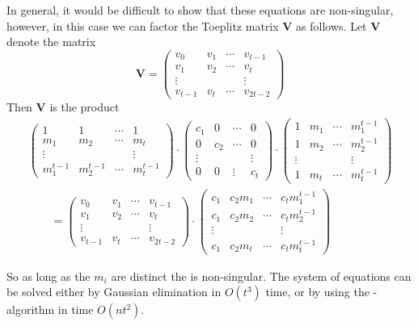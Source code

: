In general, it would be difficult to show that these equations are
non-singular, however, in this case we can factor the Toeplitz matrix
$\mathbf{V}$ as follows.  Let $\mathbf{V}$ denote the matrix
\[
\mathbf{V} = \begin{pmatrix}v_0 & v_1 & \cdots & v_{t-1} \\
v_1 & v_2 & \cdots & v_t \\
\vdots & & & \vdots\\
v_{t-1} & v_t & \cdots & v_{2t-2}\end{pmatrix}
\]
Then $\mathbf{V}$ is the product
\small
\[
\begin{aligned}
\begin{pmatrix}1 & 1 & \cdots & 1 \\
m_1 & m_2 & \cdots & m_t \\
\vdots & & & \vdots\\
m_1^{t-1} & m_2^{t-1} & \cdots & m_t^{t-1} \end{pmatrix}
\cdot
\begin{pmatrix}c_1 & 0 & \cdots & 0\\
0 & c_2 & \cdots & 0 \\
\vdots & & & \vdots \\
0 & 0 & \vdots & c_t\end{pmatrix}
\cdot
\begin{pmatrix}
1& m_1 & \cdots & m_1^{t-1}\\
1& m_2 & \cdots & m_2^{t-1}\\
\vdots& & & \vdots\\
1& m_t  & \cdots & m_t^{t-1}\end{pmatrix} \\
\qquad = \begin{pmatrix}v_0 & v_1 & \cdots & v_{t-1} \\
v_1 & v_2 & \cdots & v_t \\
\vdots & & & \vdots\\
v_{t-1} & v_t & \cdots & v_{2t-2}\end{pmatrix} 
\cdot
\begin{pmatrix}
c_1& c_2 m_1 & \cdots & c_t m_1^{t-1}\\
c_1 & c_2 m_2 & \cdots & c_t m_2^{t-1}\\
\vdots& & & \vdots\\
c_1& c_2 m_t  & \cdots & c_t m_t^{t-1}\end{pmatrix}
\end{aligned}
\]
\normalsize

So as long as the $m_i$ are distinct the  is
non-singular.  The system of equations  can be
solved either by Gaussian elimination in $O(t^3)$ time, or by using
the {\Berlekamp}-{\Massey} algorithm
\cite{Massey69,Blahut83} in time $O(nt^2)$. 

